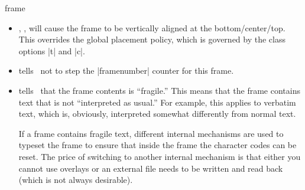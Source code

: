 \begin{environment}{{frame}}
\begin{frame}[<+->][plain]
\begin{frame}[plain]
\begin{itemize}
    The use of this option is \emph{evil}. In a (good) presentation you prepare each slide carefully and think twice before putting something on a certain slide rather than on some different slide. Using the |allowframebreaks| option invites the creation of horrible, endless presentations that resemble more a ``paper projected on the wall'' than a presentation. Nevertheless, the option does have its uses. Most noticeably, it can be convenient for automatically splitting bibliographies or long equations.

    \example
\begin{verbatim}
\begin{frame}[allowframebreaks]{References}
  \begin{thebibliography}{XX}

  \bibitem...
  \bibitem...
    ...
  \bibitem...
  \end{thebibliography}
\end{frame}
\end{verbatim}

    \example
\begin{verbatim}
\begin{frame}[allowframebreaks,allowdisplaybreaks]{A Long Equation}
  \begin{align}
    \zeta(2) &= 1 + 1/4 + 1/9 + \cdots \\
    &= ... \\
    ...
    &= \pi^2/6.
  \end{align}
\end{frame}
\end{verbatim}

  \item
    , ,  will cause the frame to be vertically aligned at the bottom/center/top. This overrides the global placement policy, which is governed by the class options |t| and |c|.
  \item
     tells \beamer\ not to step the |framenumber| counter for this frame.
  \item
     tells \beamer\ that the frame contents is ``fragile.'' This means that the frame contains text that is not ``interpreted as usual.'' For example, this applies to verbatim text, which is, obviously, interpreted somewhat differently from normal text.

    If a frame contains fragile text, different internal mechanisms are used to typeset the frame to ensure that inside the frame the character codes can be reset. The price of switching to another internal mechanism is that either you cannot use overlays or an external file needs to be written and read back (which is not always desirable).


\end{itemize}
\end{frame}
\end{frame}
\end{environment}

